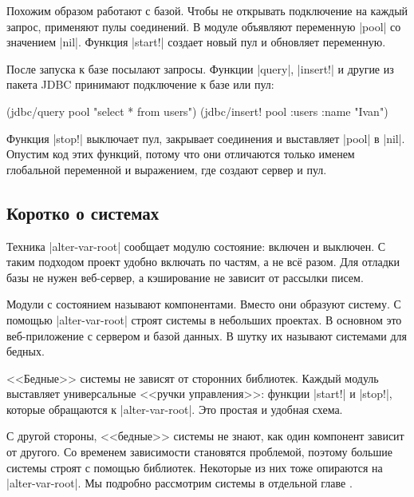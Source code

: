 
Похожим образом работают с базой. Чтобы не открывать подключение на каждый
запрос, применяют пулы соединений. В модуле объявляют переменную \spverb|pool|
со значением \spverb|nil|. Функция \spverb|start!| создает новый пул и обновляет
переменную.


После запуска к базе посылают запросы. Функции \spverb|query|, \spverb|insert!|
и другие из пакета JDBC принимают подключение к базе или пул:

\begin{english}
  \begin{clojure}
(jdbc/query pool "select * from users")
(jdbc/insert! pool :users {:name "Ivan"})
  \end{clojure}
\end{english}

Функция \spverb|stop!| выключает пул, закрывает соединения и выставляет
\spverb|pool| в \spverb|nil|. Опустим код этих функций, потому что они
отличаются только именем глобальной переменной и выражением, где создают сервер
и пул.

\subsection{Коротко о системах}


\label{systems-intro}

Техника \spverb|alter-var-root| сообщает модулю состояние: включен и выключен. С
таким подходом проект удобно включать по частям, а не вс\"{е} разом. Для отладки
базы не нужен веб-сервер, а кэширование не зависит от рассылки писем.

Модули с состоянием называют компонентами. Вместо они образуют систему. С
помощью \spverb|alter-var-root| строят системы в небольших проектах. В основном
это веб-приложение с сервером и базой данных. В шутку их называют системами для
бедных.


<<Бедные>> системы не зависят от сторонних библиотек. Каждый модуль выставляет
универсальные <<ручки управления>>: функции \spverb|start!| и \spverb|stop!|,
которые обращаются к \spverb|alter-var-root|. Это простая и удобная схема.

С другой стороны, <<бедные>> системы не знают, как один компонент зависит от
другого. Со временем зависимости становятся проблемой, поэтому большие системы
строят с помощью библиотек. Некоторые из них тоже опираются на
\spverb|alter-var-root|. Мы подробно рассмотрим системы в отдельной
главе .

